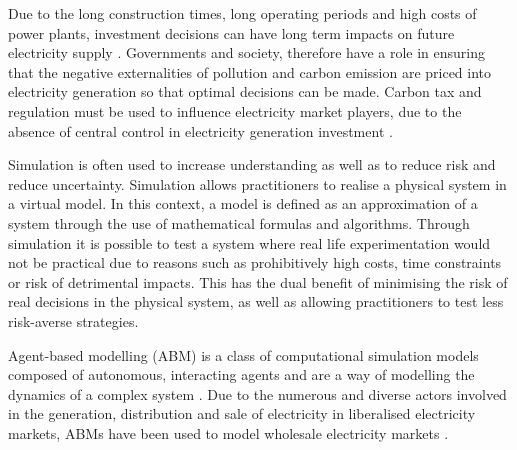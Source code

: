 
 Due to the long construction times, long operating periods and high costs of power plants, investment decisions can have long term impacts on future electricity supply \cite{Chappin2017}. Governments and society, therefore have a role in ensuring that the negative externalities of pollution and carbon emission are priced into electricity generation so that optimal decisions can be made. Carbon tax and regulation must be used to influence electricity market players, due to the absence of central control in electricity generation investment \cite{May2002}.

Simulation is often used to increase understanding as well as to reduce risk and reduce uncertainty. Simulation allows practitioners to realise a physical system in a virtual model. In this context, a model is defined as an approximation of a system through the use of mathematical formulas and algorithms. Through simulation it is possible to test a system where real life experimentation would not be practical due to reasons such as prohibitively high costs, time constraints or risk of detrimental impacts. This has the dual benefit of minimising the risk of real decisions in the physical system, as well as allowing practitioners to test less risk-averse strategies.

Agent-based modelling (ABM) is a class of computational simulation models composed of autonomous, interacting agents and are a way of modelling the dynamics of a complex system \cite{MacAl2010}. Due to the numerous and diverse actors involved in the generation, distribution and sale of electricity in liberalised electricity markets, ABMs have been used to model wholesale electricity markets \cite{Ringler2016a}.

